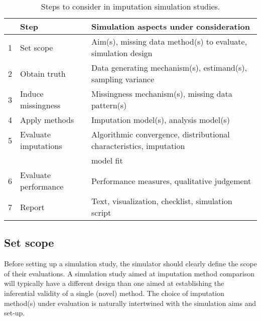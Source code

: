 \documentclass[bimj,fleqn]{w-art}
\begin{document}
\begin{table}[tb]
\begin{center}
\caption{Steps to consider in imputation simulation studies.}
\label{table:steps}
\begin{tabular}{lll}
\hline
&Step                    & Simulation aspects under consideration \\
\hline  
1&Set scope            & Aim(s), missing data method(s) to evaluate, simulation design \\
2&Obtain truth         & Data generating mechanism(s), estimand(s), sampling variance \\
3&Induce missingness   & Missingness mechanism(s), missing data pattern(s) \\
4&Apply methods        & Imputation model(s), analysis model(s) \\
5&Evaluate imputations & Algorithmic convergence, distributional characteristics, imputation \\
 &                      & model fit \\
6&Evaluate performance & Performance measures, qualitative judgement \\
7&Report               & Text, visualization, checklist, simulation script \\
\hline
\end{tabular}
\end{center}
\end{table}



\subsection{Set scope}

Before setting up a simulation study, the simulator should clearly define the scope of their evaluations. A simulation study aimed at imputation method comparison will typically have a different design than one aimed at establishing the inferential validity of a single (novel) method. The choice of imputation method(s) under evaluation is naturally intertwined with the simulation aims and set-up.
\end{document}
